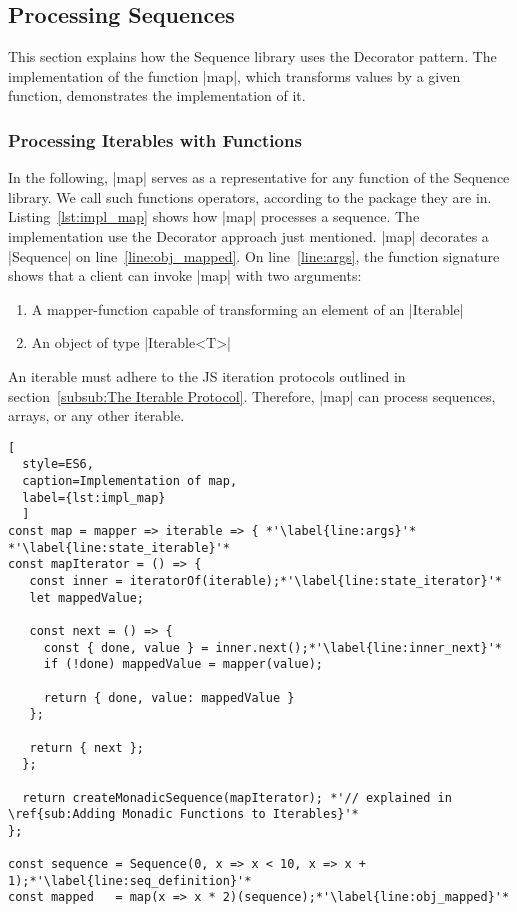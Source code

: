 \subsection{Processing Sequences}
\label{sub:Processing Sequences}
This section explains how the Sequence library uses the Decorator pattern.
The implementation of the function |map|, which transforms values by a given
function, demonstrates the implementation of it. 

\subsubsection{Processing Iterables with Functions}
\label{subsub:Processing Iterables with Functions}
In the following, |map| serves as a representative for any function of the
Sequence library. We call such functions operators, according
to the package they are in.
Listing~\ref{lst:impl_map} shows how |map| processes a sequence. The
implementation use the Decorator approach just mentioned. |map| decorates a
|Sequence| on line~\ref{line:obj_mapped}.
\newline
On line~\ref{line:args}, the function signature shows that a client can invoke 
|map| with two arguments:

\begin{enumerate}
  \item{A mapper-function capable of transforming an element of an |Iterable|}
  \item{An object of type |Iterable<T>|}
\end{enumerate}

An iterable must adhere to the JS iteration protocols outlined in
section~\ref{subsub:The Iterable Protocol}. Therefore, |map| can process
sequences, arrays, or any other iterable. 

\begin{lstlisting}[
  style=ES6, 
  caption=Implementation of map,
  label={lst:impl_map}
  ]
const map = mapper => iterable => { *'\label{line:args}'*
*'\label{line:state_iterable}'*
const mapIterator = () => {
   const inner = iteratorOf(iterable);*'\label{line:state_iterator}'*
   let mappedValue;
 
   const next = () => {
     const { done, value } = inner.next();*'\label{line:inner_next}'*
     if (!done) mappedValue = mapper(value);
 
     return { done, value: mappedValue }
   };
 
   return { next };
  };
 
  return createMonadicSequence(mapIterator); *'// explained in \ref{sub:Adding Monadic Functions to Iterables}'*
};

const sequence = Sequence(0, x => x < 10, x => x + 1);*'\label{line:seq_definition}'*
const mapped   = map(x => x * 2)(sequence);*'\label{line:obj_mapped}'*
\end{lstlisting}

